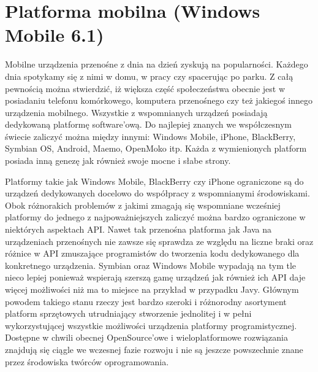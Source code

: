 \section{Platforma mobilna (Windows Mobile 6.1)}

Mobilne urządzenia przenośne z dnia na dzień zyskują na popularności. Każdego
dnia spotykamy się z nimi w domu, w pracy czy spacerując po parku. Z całą pewnością
można stwierdzić, iż większa część społeczeństwa obecnie jest w posiadaniu
telefonu komórkowego, komputera przenośnego czy też jakiegoś innego urządzenia
mobilnego. Wszystkie z wspomnianych urządzeń posiadają dedykowaną platformę
software'ową. Do najlepiej znanych we współczesnym świecie zaliczyć można między
innymi: Windows Mobile, iPhone, BlackBerry, Symbian OS, Android, Maemo, OpenMoko
itp. Każda z wymienionych platform posiada inną genezę jak również swoje mocne i
słabe strony.

Platformy takie jak Windows Mobile, BlackBerry czy iPhone ograniczone są do
urządzeń dedykowanych docelowo do współpracy z wspomnianymi środowiskami. Obok
różnorakich problemów z jakimi zmagają się wspomniane wcześniej platformy do
jednego z najpoważniejszych zaliczyć można bardzo ograniczone w niektórych
aspektach API. Nawet tak przenośna platforma jak Java na urządzeniach przenośnych
nie zawsze się sprawdza ze względu na liczne braki oraz różnice w API zmuszające
programistów do tworzenia kodu dedykowanego dla konkretnego urządzenia. Symbian
oraz Windows Mobile wypadają na tym tle nieco lepiej ponieważ wspierają szerszą
gamę urządzeń jak również ich API daje więcej możliwości niż ma to miejsce na
przykład w przypadku Javy. Głównym powodem takiego stanu rzeczy jest bardzo
szeroki i różnorodny asortyment platform sprzętowych utrudniający stworzenie
jednolitej i w pełni wykorzystującej wszystkie możliwości urządzenia platformy
programistycznej. Dostępne w chwili obecnej OpenSource'owe i wieloplatformowe
rozwiązania znajdują się ciągle we wczesnej fazie rozwoju i nie są jeszcze
powszechnie znane przez środowiska twórców oprogramowania.

